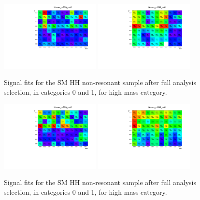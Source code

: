 \begin{figure}[h]
  \centering
  \includegraphics[width=0.45\textwidth]{figures/sec-bias/biases_m250_cat0.pdf}\hfil
  \includegraphics[width=0.45\textwidth]{figures/sec-bias/biases_m250_cat1.pdf}\hfil
  \caption{Signal fits for the SM HH non-resonant sample after full analysis selection, in categories 0 and 1, for high mass category.}
  \label{fig:bkg_bias1}
\end{figure}
\begin{figure}[h]
  \centering
  \includegraphics[width=0.45\textwidth]{figures/sec-bias/biases_m280_cat0.pdf}\hfil
  \includegraphics[width=0.45\textwidth]{figures/sec-bias/biases_m280_cat1.pdf}\hfil
  \caption{Signal fits for the SM HH non-resonant sample after full analysis selection, in categories 0 and 1, for high mass category.}
  \label{fig:bkg_bias2}
\end{figure}
